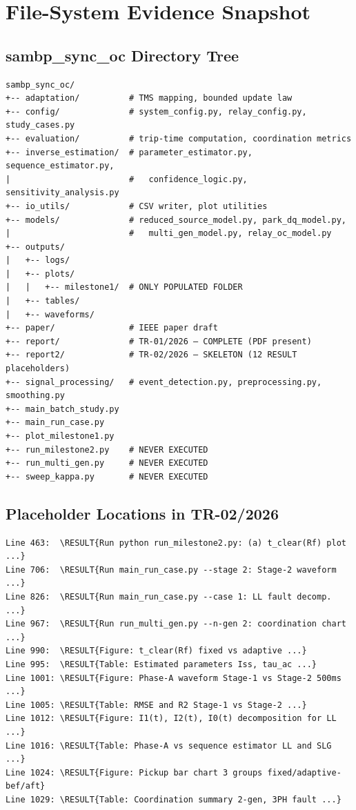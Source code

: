 \documentclass[12pt,a4paper]{article}
\begin{document}
\newpage

\appendix
\section{File-System Evidence Snapshot}
\label{app:filesystem}

\subsection{sambp\_sync\_oc Directory Tree}

\begin{verbatim}
sambp_sync_oc/
+-- adaptation/          # TMS mapping, bounded update law
+-- config/              # system_config.py, relay_config.py, study_cases.py
+-- evaluation/          # trip-time computation, coordination metrics
+-- inverse_estimation/  # parameter_estimator.py, sequence_estimator.py,
|                        #   confidence_logic.py, sensitivity_analysis.py
+-- io_utils/            # CSV writer, plot utilities
+-- models/              # reduced_source_model.py, park_dq_model.py,
|                        #   multi_gen_model.py, relay_oc_model.py
+-- outputs/
|   +-- logs/
|   +-- plots/
|   |   +-- milestone1/  # ONLY POPULATED FOLDER
|   +-- tables/
|   +-- waveforms/
+-- paper/               # IEEE paper draft
+-- report/              # TR-01/2026 — COMPLETE (PDF present)
+-- report2/             # TR-02/2026 — SKELETON (12 RESULT placeholders)
+-- signal_processing/   # event_detection.py, preprocessing.py, smoothing.py
+-- main_batch_study.py
+-- main_run_case.py
+-- plot_milestone1.py
+-- run_milestone2.py    # NEVER EXECUTED
+-- run_multi_gen.py     # NEVER EXECUTED
+-- sweep_kappa.py       # NEVER EXECUTED
\end{verbatim}

\subsection{Placeholder Locations in TR-02/2026}

\begin{verbatim}
Line 463:  \RESULT{Run python run_milestone2.py: (a) t_clear(Rf) plot ...}
Line 706:  \RESULT{Run main_run_case.py --stage 2: Stage-2 waveform ...}
Line 826:  \RESULT{Run main_run_case.py --case 1: LL fault decomp. ...}
Line 967:  \RESULT{Run run_multi_gen.py --n-gen 2: coordination chart ...}
Line 990:  \RESULT{Figure: t_clear(Rf) fixed vs adaptive ...}
Line 995:  \RESULT{Table: Estimated parameters Iss, tau_ac ...}
Line 1001: \RESULT{Figure: Phase-A waveform Stage-1 vs Stage-2 500ms ...}
Line 1005: \RESULT{Table: RMSE and R2 Stage-1 vs Stage-2 ...}
Line 1012: \RESULT{Figure: I1(t), I2(t), I0(t) decomposition for LL ...}
Line 1016: \RESULT{Table: Phase-A vs sequence estimator LL and SLG ...}
Line 1024: \RESULT{Figure: Pickup bar chart 3 groups fixed/adaptive-bef/aft}
Line 1029: \RESULT{Table: Coordination summary 2-gen, 3PH fault ...}
\end{verbatim}
\end{document}
